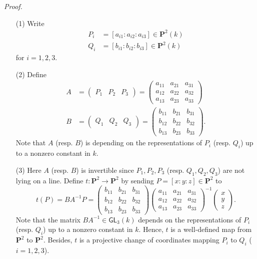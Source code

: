 \documentclass{article}
\begin{document}
\emph{Proof.}
\begin{enumerate}
\item[(1)]
  Write
  \begin{align*}
    P_i &= [a_{i1} : a_{i2} : a_{i3}] \in \mathbf{P}^2(k) \\
    Q_i &= [b_{i1} : b_{i2} : b_{i3}] \in \mathbf{P}^2(k)
  \end{align*}
  for $i = 1, 2, 3$.

\item[(2)]
  Define
  \begin{align*}
    A
    &=
    \begin{pmatrix}
      P_1 & P_2 & P_3
    \end{pmatrix}
    =
    \begin{pmatrix}
      a_{11} & a_{21} & a_{31} \\
      a_{12} & a_{22} & a_{32} \\
      a_{13} & a_{23} & a_{33}
    \end{pmatrix} \\
    B
    &=
    \begin{pmatrix}
      Q_1 & Q_2 & Q_3
    \end{pmatrix}
    =
    \begin{pmatrix}
      b_{11} & b_{21} & b_{31} \\
      b_{12} & b_{22} & b_{32} \\
      b_{13} & b_{23} & b_{33}
    \end{pmatrix}.
  \end{align*}
  Note that
  $A$ (resp. $B$) is depending on the representations of $P_i$ (resp. $Q_i$)
  up to a nonzero constant in $k$.

\item[(3)]
  Here $A$ (resp. $B$) is invertible since
  $P_1, P_2, P_3$ (resp. $Q_1, Q_2, Q_3$) are not lying on a line.
  Define $t: \mathbf{P}^2 \to \mathbf{P}^2$ by sending $P = [x:y:z] \in \mathbf{P}^2$
  to
  \[
    t(P)
    = BA^{-1}P
    =
    \begin{pmatrix}
      b_{11} & b_{21} & b_{31} \\
      b_{12} & b_{22} & b_{32} \\
      b_{13} & b_{23} & b_{33}
    \end{pmatrix}
    \begin{pmatrix}
      a_{11} & a_{21} & a_{31} \\
      a_{12} & a_{22} & a_{32} \\
      a_{13} & a_{23} & a_{33}
    \end{pmatrix}^{-1}
    \begin{pmatrix}
      x \\
      y \\
      z
    \end{pmatrix}.
  \]
  Note that the matrix $BA^{-1} \in \mathsf{GL}_3(k)$
  depends on the representations of $P_i$ (resp. $Q_i$)
  up to a nonzero constant in $k$.
  Hence, $t$ is a well-defined map from $\mathbf{P}^2$ to $\mathbf{P}^2$.
  Besides, $t$ is a projective change of coordinates mapping $P_i$ to $Q_i$
  ($i = 1, 2, 3$).


\end{enumerate}
\end{document}
